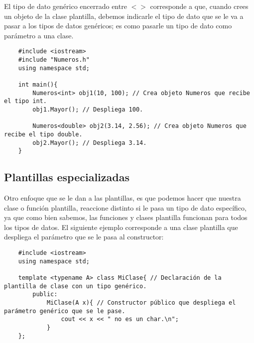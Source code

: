 El tipo de dato genérico encerrado entre $<>$ corresponde a que, cuando crees un objeto de la clase plantilla, debemos indicarle el tipo de dato que se le va a pasar a los tipos de datos genéricos; es como pasarle un tipo de dato como parámetro a una clase.
\begin{lstlisting}
    #include <iostream>
    #include "Numeros.h"
    using namespace std;
    
    int main(){
        Numeros<int> obj1(10, 100); // Crea objeto Numeros que recibe el tipo int.
        obj1.Mayor(); // Despliega 100.
        
        Numeros<double> obj2(3.14, 2.56); // Crea objeto Numeros que recibe el tipo double.
        obj2.Mayor(); // Despliega 3.14.
    }
\end{lstlisting}


\subsection{Plantillas especializadas}

Otro enfoque que se le dan a las plantillas, es que podemos hacer que nuestra clase o función plantilla, reaccione distinto si le pasa un tipo de dato específico, ya que como bien sabemos, las funciones y clases plantilla funcionan para todos los tipos de datos. El siguiente ejemplo corresponde a una clase plantilla que despliega el parámetro que se le pasa al constructor:
\begin{lstlisting}
    #include <iostream>
    using namespace std;
    
    template <typename A> class MiClase{ // Declaración de la plantilla de clase con un tipo genérico.
        public:
            MiClase(A x){ // Constructor público que despliega el parámetro genérico que se le pase.
                cout << x << " no es un char.\n";
            }
    };
\end{lstlisting}

